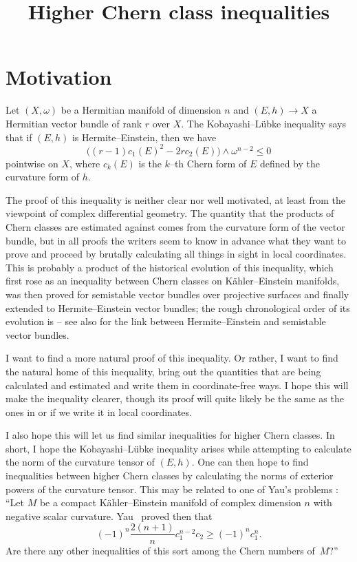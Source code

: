 \documentclass[11pt,a4paper]{amsart}
\title{Higher Chern class inequalities}
\theoremstyle{definition}
\theoremstyle{remark}
\numberwithin{equation}{section}
\begin{document}
\maketitle 



\section*{Motivation}

Let $(X,\omega)$ be a Hermitian manifold of dimension $n$ and $(E,h) \to X$
a Hermitian vector bundle of rank $r$ over $X$. The Kobayashi--L\"{u}bke
inequality says that if $(E,h)$ is Hermite--Einstein, then we have
$$
\bigl((r-1)c_1(E)^2 - 2rc_2(E)\bigr) \wedge \omega^{n-2} \leq 0
$$
pointwise on $X$, where $c_k(E)$ is the $k$--th Chern form of $E$ defined by the curvature form of $h$.

The proof of this inequality is neither clear nor well motivated, at
least from the viewpoint of complex differential geometry. The quantity
that the products of Chern classes are estimated against comes from the
curvature form of the vector bundle, but in all proofs the writers seem
to know in advance what they want to prove and proceed by brutally
calculating all things in sight in local coordinates. This is probably a
product of the historical evolution of this inequality, which first rose as
an inequality between Chern classes on K\"ahler--Einstein manifolds, was
then proved for semistable vector bundles over projective surfaces and
finally extended to Hermite--Einstein vector bundles; the rough
chronological order of its evolution is
\cite{Chen-Ogiue,Miyaoka,Bogomolov,Gieseker,Lubke} -- see also
\cite{Kobayashi,LubkeStab,Siu} for the link between Hermite--Einstein
and semistable vector bundles.

I want to find a more natural proof of this inequality. Or rather, I want
to find the natural home of this inequality, bring out the quantities
that are being calculated and estimated and write them in coordinate-free
ways. I hope this will make the inequality clearer, though its proof will
quite likely be the same as the ones in \cite{Chen-Ogiue} or \cite{Lubke}
if we write it in local coordinates.

I also hope this will let us find similar inequalities for higher Chern
classes. In short, I hope the Kobayashi--L\"{u}bke inequality arises while
attempting to calculate the norm of the curvature tensor of $(E,h)$. One can
then hope to find inequalities between higher Chern classes by calculating
the norms of exterior powers of the curvature tensor. This may be related
to one of Yau's problems \cite[Problem~45]{Yau}: ``Let $M$ be a compact
K\"{a}hler--Einstein manifold of complex dimension $n$ with negative scalar
curvature. Yau~\cite{Yau2} proved then that
$$
(-1)^n \frac{2(n+1)}{n} c_1^{n-2} c_2 \geq (-1)^n c_1^n.
$$
Are there any other inequalities of this sort among the Chern numbers
of~$M$?''%
\end{document}
